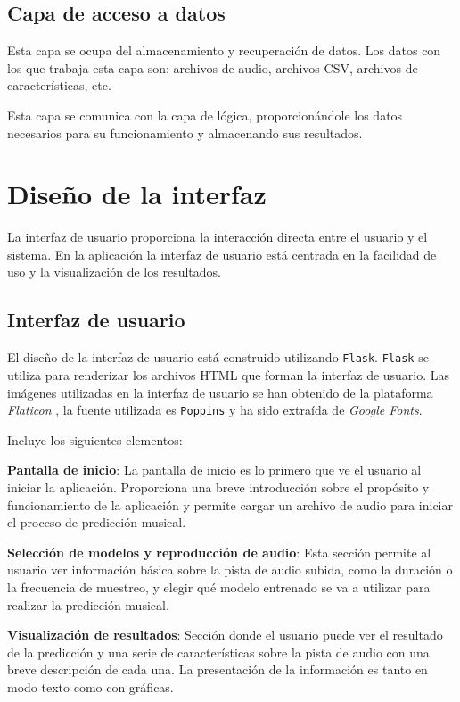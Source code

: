 \subsection{Capa de acceso a datos}

Esta capa se ocupa del almacenamiento y recuperación de datos. Los datos con los que trabaja esta capa son: archivos de audio, archivos CSV, archivos de características, etc.

Esta capa se comunica con la capa de lógica, proporcionándole los datos necesarios para su funcionamiento y almacenando sus resultados.


\section{Diseño de la interfaz}

La interfaz de usuario proporciona la interacción directa entre el usuario y el sistema. En la aplicación la interfaz de usuario está centrada en la facilidad de uso y la visualización de los resultados.

\subsection{Interfaz de usuario}

El diseño de la interfaz de usuario está construido utilizando \texttt{Flask}. \texttt{Flask} se utiliza para renderizar los archivos HTML que forman la interfaz de usuario. Las imágenes utilizadas en la interfaz de usuario se han obtenido de la plataforma \textit{Flaticon} \cite{Flaticon}, la fuente utilizada es \texttt{Poppins} y ha sido extraída de \textit{Google Fonts}. \cite{Google_Fonts}

Incluye los siguientes elementos:

\textbf{Pantalla de inicio}: La pantalla de inicio es lo primero que ve el usuario al iniciar la aplicación. Proporciona una breve introducción sobre el propósito y funcionamiento de la aplicación y permite cargar un archivo de audio para iniciar el proceso de predicción musical.


\textbf{Selección de modelos y reproducción de audio}: Esta sección permite al usuario ver información básica sobre la pista de audio subida, como la duración o la frecuencia de muestreo, y elegir qué modelo entrenado se va a utilizar para realizar la predicción musical.


\textbf{Visualización de resultados}: Sección donde el usuario puede ver el resultado de la predicción y una serie de características sobre la pista de audio con una breve descripción de cada una. La presentación de la información es tanto en modo texto como con gráficas.

